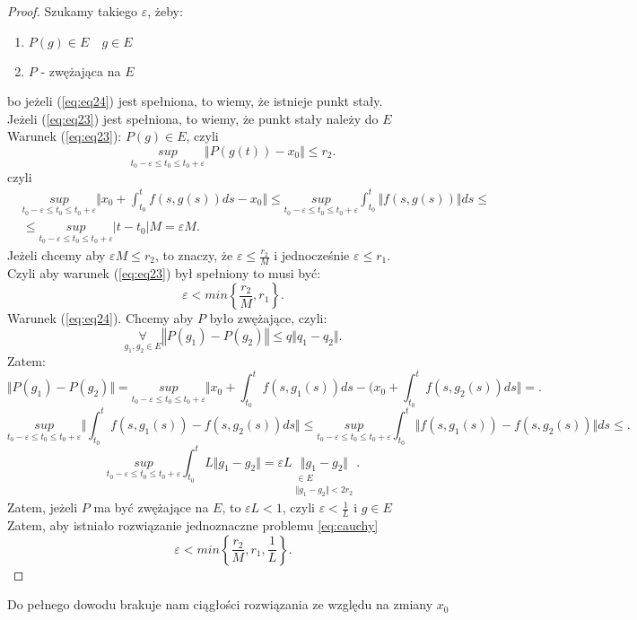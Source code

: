 \documentclass[../main.tex]{subfiles}
\begin{document}
\begin{proof}
            Szukamy takiego $\varepsilon$, żeby:
            \begin{enumerate}
                \item $P(g)\in E \quad g\in E$\label{eq:eq23}
                \item $P$ - zwężająca na $E$\label{eq:eq24}
            \end{enumerate}
            bo jeżeli (\ref{eq:eq24}) jest spełniona, to wiemy, że istnieje punkt stały.\\
            Jeżeli (\ref{eq:eq23}) jest spełniona, to wiemy, że punkt stały należy do  $E$\\
            Warunek (\ref{eq:eq23}):
            $P(g)\in E$, czyli
            \[
                \underset{t_0-\varepsilon\leq t_0\leq t_0+\varepsilon}{sup} \Vert P(g(t)) - x_0 \Vert \leq r_2
            .\]
            czyli
            \begin{align*}
                &\underset{t_0-\varepsilon\leq t_0\leq t_0+\varepsilon}{sup} \Vert x_0 + \int_{t_0}^t f(s,g(s))ds - x_0 \Vert \leq \underset{t_0-\varepsilon\leq t_0\leq t_0+\varepsilon}{sup} \int_{t_0}^t \Vert f(s,g(s)) \Vert ds \leq\\
                & \le \underset{t_0-\varepsilon\leq t_0\leq t_0+\varepsilon}{sup} |t-t_0| M = \varepsilon M
            .\end{align*}
            Jeżeli chcemy aby $\varepsilon M \leq r_2$, to znaczy, że $\varepsilon \leq \frac{r_2}{M}$ i jednocześnie $\varepsilon\leq r_1$.\\
            Czyli aby warunek (\ref{eq:eq23}) był spełniony to musi być:
            \[
                \varepsilon < min \left\{ \frac{r_2}{M}, r_1 \right\}
            .\]
        Warunek (\ref{eq:eq24}). Chcemy aby $P$ było zwężające, czyli:
            \[
                \underset{g_1,g_2\in E}{\forall}  \left\Vert P(g_1) - P(g_2) \right\Vert \le q\Vert q_1-q_2 \Vert
            .\]
            Zatem:
            \[
                \Vert P(g_1) - P(g_2) \Vert  = \underset{t_0-\varepsilon\leq t_0\leq t_0+\varepsilon}{sup} \Vert x_0 + \int_{t_0}^t f(s,g_1(s))ds - (x_0 + \int_{t_0}^t f(s,g_2(s))ds \Vert =
            .\]
            \[
                \underset{t_0-\varepsilon\leq t_0\leq t_0+\varepsilon}{sup} \Vert \int_{t_0}^t f(s,g_1(s)) - f(s,g_2(s)) ds \Vert \le \underset{t_0-\varepsilon\leq t_0\leq t_0+\varepsilon}{sup} \int_{t_0}^t \Vert f(s,g_1(s)) - f(s,g_2(s)) \Vert ds \le
            .\]
            \[
                \underset{t_0-\varepsilon\leq t_0\leq t_0+\varepsilon}{sup} \int_{t_0}^t L \Vert g_1-g_2 \Vert = \varepsilon L  \underset{\substack{\in E\\ \Vert g_1 - g_2 \Vert < 2r_2}}{\Vert g_1 - g_2 \Vert}
            .\]
            Zatem, jeżeli $P$ ma być zwężające na $E$, to $\varepsilon L < 1$, czyli $\varepsilon< \frac{1}{L}$ i $g\in E$\\
            Zatem, aby istniało rozwiązanie jednoznaczne problemu \ref{eq:cauchy} \[
                \varepsilon < min \left\{ \frac{r_2}{M}, r_1, \frac{1}{L} \right\}
            .\]
        \end{proof}
        Do pełnego dowodu brakuje nam ciągłości rozwiązania ze względu na zmiany $x_0$
\end{document}
